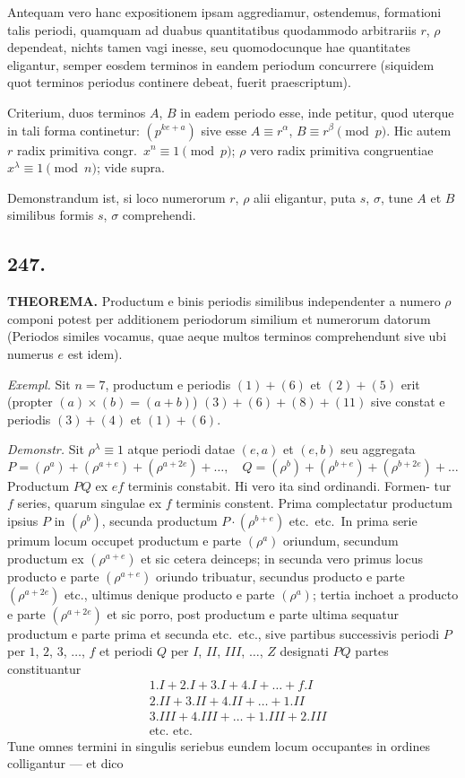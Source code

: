 \documentclass[12pt,a4paper]{article}
\begin{document}
Antequam vero hanc expositionem ipsam aggrediamur, ostendemus, formationi talis periodi, quamquam ad duabus quantitatibus quodammodo arbitrariis $r$, $\rho$ dependeat, nichts tamen vagi inesse, seu quomodocunque hae quantitates eligantur, semper eosdem terminos in eandem periodum concurrere (siquidem quot terminos periodus continere debeat, fuerit praescriptum).

Criterium, duos terminos $A$, $B$ in eadem periodo esse, inde petitur, quod uterque in tali forma continetur: $(p^{ke+a})$ sive esse $A \equiv r^{\alpha}$, $B \equiv r^{\beta}\pmod{p}$. Hic autem $r$ radix primitiva congr.~$x^n\equiv 1\pmod{p}$; $\rho$ vero radix primitiva congruentiae $x^\lambda\equiv 1\pmod{n}$; vide supra.

Demonstrandum ist, si loco numerorum $r$, $\rho$ alii eligantur, puta $s$, $\sigma$, tune $A$ et $B$ similibus formis $s$, $\sigma$ comprehendi.

\subsection*{247.}

\textbf{THEOREMA.} Productum e binis periodis similibus independenter a numero $\rho$ componi potest per additionem periodorum similium et numerorum datorum (Periodos similes vocamus, quae aeque multos terminos comprehendunt sive ubi numerus $e$ est idem).

\textit{Exempl.} Sit $n=7$, productum e periodis $(1)+(6)$ et $(2)+(5)$ erit (propter $(a)\times(b)=(a+b)$) $(3)+(6)+(8)+(11)$ sive constat e periodis $(3)+(4)$ et $(1)+(6)$.

\textit{Demonstr.} Sit $\rho^\lambda\equiv 1$ atque periodi datae $(e,a)$ et $(e,b)$ seu aggregata
\[
P = (\rho^a) + (\rho^{a+e}) + (\rho^{a+2e}) + \ldots,\quad Q = (\rho^b) + (\rho^{b+e}) + (\rho^{b+2e}) + \ldots
\]
Productum $PQ$ ex $ef$ terminis constabit. Hi vero ita sind ordinandi. Formen- tur $f$ series, quarum singulae ex $f$ terminis constent. Prima complectatur productum ipsius $P$ in $(\rho^b)$, secunda productum $P\cdot(\rho^{b+e})$ etc.~etc.~In prima serie primum locum occupet productum e parte $(\rho^a)$ oriundum, secundum productum ex $(\rho^{a+e})$ et sic cetera deinceps; in secunda vero primus locus producto e parte $(\rho^{a+e})$ oriundo tribuatur, secundus producto e parte $(\rho^{a+2e})$ etc., ultimus denique producto e parte $(\rho^a)$; tertia inchoet a producto e parte $(\rho^{a+2e})$ et sic porro, post productum e parte ultima sequatur productum e parte prima et secunda etc.~etc., sive partibus successivis periodi $P$ per $1$, $2$, $3$, $\ldots$, $f$ et periodi $Q$ per $I$, $II$, $III$, $\ldots$, $Z$ designati $PQ$ partes constituantur
\[
\begin{aligned}
& 1.I + 2.I + 3.I + 4.I + \ldots + f.I\\
& 2.II + 3.II + 4.II + \ldots + 1.II\\
& 3.III + 4.III + \ldots + 1.III + 2.III\\
& \text{etc. etc.}
\end{aligned}
\]
Tune omnes termini in singulis seriebus eundem locum occupantes in ordines colligantur --- et dico
\end{document}
